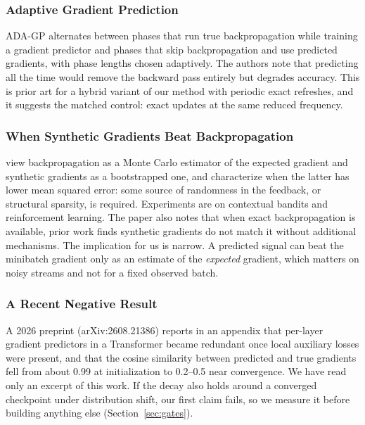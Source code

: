 \documentclass{article}
\begin{document}
\subsubsection{Adaptive Gradient Prediction}

ADA-GP \parencite{janfaza2023adagp} alternates between phases that run true
backpropagation while training a gradient predictor and phases that skip
backpropagation and use predicted gradients, with phase lengths chosen
adaptively. The authors note that predicting all the time would remove the
backward pass entirely but degrades accuracy. This is prior art for a hybrid
variant of our method with periodic exact refreshes, and it suggests the
matched control: exact updates at the same reduced frequency.

\subsubsection{When Synthetic Gradients Beat Backpropagation}

\textcite{zhang2026backprop} view backpropagation as a Monte Carlo estimator of
the expected gradient and synthetic gradients as a bootstrapped one, and
characterize when the latter has lower mean squared error: some source of
randomness in the feedback, or structural sparsity, is required. Experiments
are on contextual bandits and reinforcement learning. The paper also notes that
when exact backpropagation is available, prior work finds synthetic gradients
do not match it without additional mechanisms. The implication for us is
narrow. A predicted signal can beat the minibatch gradient only as an estimate
of the \emph{expected} gradient, which matters on noisy streams and not for a
fixed observed batch.

\subsubsection{A Recent Negative Result}

A 2026 preprint (arXiv:2608.21386) reports in an appendix that per-layer
gradient predictors in a Transformer became redundant once local auxiliary
losses were present, and that the cosine similarity between predicted and true
gradients fell from about 0.99 at initialization to 0.2--0.5 near convergence.
We have read only an excerpt of this work. If the decay also holds around a
converged checkpoint under distribution shift, our first claim fails, so we
measure it before building anything else (Section~\ref{sec:gates}).
\end{document}
